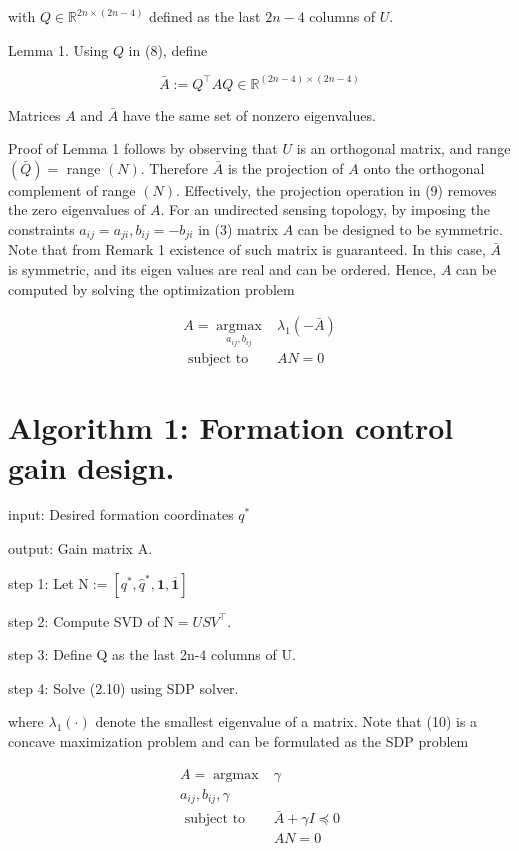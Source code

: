 \documentclass[10pt]{article}
\begin{document}
with $Q \in \mathbb{R}^{2 n \times(2 n-4)}$ defined as the last $2 n-4$ columns of $U$.

Lemma 1. Using $Q$ in (8), define

$$
\bar{A}:=Q^{\top} A Q \in \mathbb{R}^{(2 n-4) \times(2 n-4)}
$$

Matrices $A$ and $\bar{A}$ have the same set of nonzero eigenvalues.

Proof of Lemma 1 follows by observing that $U$ is an orthogonal matrix, and range $(\bar{Q})=$ range $(N)$. Therefore $\bar{A}$ is the projection of $A$ onto the orthogonal complement of range $(N)$. Effectively, the projection operation in (9) removes the zero eigenvalues of $A$. For an undirected sensing topology, by imposing the constraints $a_{i j}=a_{j i}, b_{i j}=-b_{j i}$ in (3) matrix $A$ can be designed to be symmetric. Note that from Remark 1 existence of such matrix is guaranteed. In this case, $\bar{A}$ is symmetric, and its eigen values are real and can be ordered. Hence, $A$ can be computed by solving the optimization problem

$$
\begin{array}{cc}
A=\underset{a_{i j}, b_{i j}}{\operatorname{argmax}} & \lambda_{1}(-\bar{A}) \\
\text { subject to } & A N=0
\end{array}
$$

\section{Algorithm 1: Formation control gain design.}
input: Desired formation coordinates $q^{*}$

output: Gain matrix A.

step 1: Let $\mathrm{N}:=\left[q^{*}, \hat{q}^{*}, \mathbf{1}, \overline{\mathbf{1}}\right]$

step 2: Compute SVD of $\mathrm{N}=U S V^{\top}$.

step 3: Define $\mathrm{Q}$ as the last 2n-4 columns of $\mathrm{U}$.

step 4: Solve (2.10) using SDP solver.

where $\lambda_{1}(\cdot)$ denote the smallest eigenvalue of a matrix. Note that (10) is a concave maximization problem and can be formulated as the SDP problem

$$
\begin{aligned}
A=\operatorname{argmax} & \gamma \\
a_{i j}, b_{i j}, \gamma & \\
\text { subject to } & \bar{A}+\gamma I \preceq 0 \\
& A N=0
\end{aligned}
$$
\end{document}

